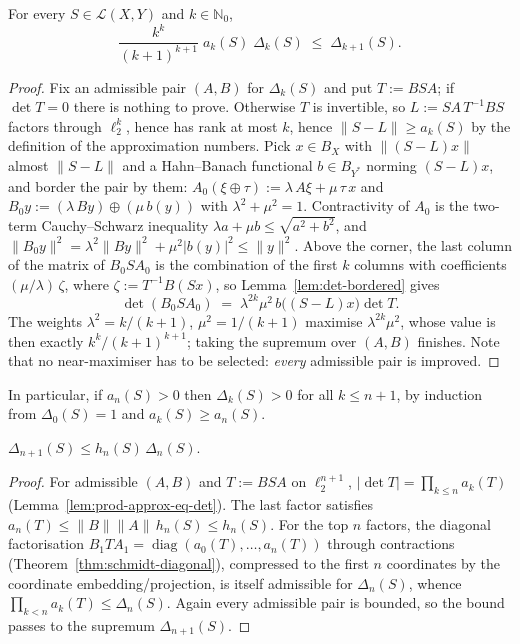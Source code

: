 \begin{lemma}
\label{lem:det-growth}
\leanok
{}
For every $S \in \mathcal{L}(X, Y)$ and $k \in \mathbb{N}_0$,
\[
  \frac{k^k}{(k+1)^{k+1}}\; a_k(S)\; \Delta_k(S) \;\le\; \Delta_{k+1}(S).
\]
\end{lemma}
\begin{proof}
\leanok
{}
Fix an admissible pair $(A, B)$ for $\Delta_k(S)$ and put $T := BSA$; if
$\det T = 0$ there is nothing to prove. Otherwise $T$ is invertible, so
$L := SA\,T^{-1}BS$ factors through $\ell_2^k$, hence has rank at most $k$,
hence $\|S - L\| \ge a_k(S)$ by the definition of the approximation numbers.
Pick $x \in B_X$ with $\|(S-L)x\|$ almost $\|S - L\|$ and a Hahn--Banach
functional $b \in B_{Y^*}$ norming $(S-L)x$, and border the pair by them:
$A_0(\xi \oplus \tau) := \lambda\, A\xi + \mu\, \tau\, x$ and
$B_0 y := (\lambda\, B y) \oplus (\mu\, b(y))$ with
$\lambda^2 + \mu^2 = 1$. Contractivity of $A_0$ is the two-term
Cauchy--Schwarz inequality $\lambda a + \mu b \le \sqrt{a^2+b^2}$, and
$\|B_0 y\|^2 = \lambda^2\|By\|^2 + \mu^2 |b(y)|^2 \le \|y\|^2$. Above the
corner, the last column of the matrix of $B_0SA_0$ is the combination of the
first $k$ columns with coefficients $(\mu/\lambda)\, \zeta$, where
$\zeta := T^{-1}B(Sx)$, so Lemma~\ref{lem:det-bordered} gives
\[
  \det(B_0 S A_0) \;=\; \lambda^{2k} \mu^2\, b\bigl((S-L)x\bigr) \det T .
\]
The weights $\lambda^2 = k/(k+1)$, $\mu^2 = 1/(k+1)$ maximise
$\lambda^{2k}\mu^2$, whose value is then exactly $k^k/(k+1)^{k+1}$; taking
the supremum over $(A, B)$ finishes. Note that no near-maximiser has to be
selected: \emph{every} admissible pair is improved.
\end{proof}

In particular, if $a_n(S) > 0$ then $\Delta_k(S) > 0$ for all $k \le n+1$, by
induction from $\Delta_0(S) = 1$ and $a_k(S) \ge a_n(S)$.

\begin{lemma}
\label{lem:det-upper}
\leanok
{}
$\Delta_{n+1}(S) \le h_n(S)\, \Delta_n(S)$.
\end{lemma}
\begin{proof}
\leanok
{}
For admissible $(A, B)$ and $T := B S A$ on $\ell_2^{n+1}$,
$|\det T| = \prod_{k \le n} a_k(T)$ (Lemma~\ref{lem:prod-approx-eq-det}).
The last factor satisfies $a_n(T) \le \|B\|\|A\|\, h_n(S) \le h_n(S)$. For the
top $n$ factors, the diagonal factorisation
$B_1 T A_1 = \operatorname{diag}(a_0(T), \dots, a_n(T))$ through contractions
(Theorem~\ref{thm:schmidt-diagonal}), compressed to the first $n$ coordinates
by the coordinate embedding/projection, is itself admissible for
$\Delta_n(S)$, whence $\prod_{k < n} a_k(T) \le \Delta_n(S)$. Again every
admissible pair is bounded, so the bound passes to the supremum
$\Delta_{n+1}(S)$.
\end{proof}

